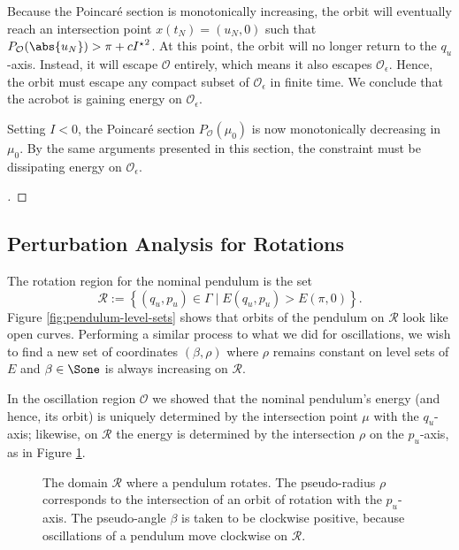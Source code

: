 Because the Poincar\'{e} section is monotonically increasing, 
the orbit will eventually reach an intersection point \(x(t_N) = (u_N,0)\)
such that \(P_\mathcal{O}(\abs{u_N}) > \pi + c{I^\star}^2\). 
At this point, the orbit will no longer return to the
\(q_u\)-axis.
Instead, it will escape \(\mathcal{O}\) entirely, which means
it also escapes \(\mathcal{O}_\epsilon\).
Hence, the orbit must escape any compact subset of 
\(\mathcal{O}_\epsilon\) in finite time. 
We conclude that the acrobot is gaining energy on \(\mathcal{O}_\epsilon\).

Setting \(I < 0\), the Poincar\'{e} section \(P_\mathcal{O}(\mu_0)\) is now
monotonically decreasing in \(\mu_0\).
By the same arguments presented in this section, the constraint 
must be dissipating energy on \(\mathcal{O}_\epsilon\).

\begin{proof}[\unskip\nopunct]
\end{proof}

\subsection*{Perturbation Analysis for Rotations}
The rotation region for the nominal pendulum is the set
\[
    \mathcal{R} := \left\{ (q_u,p_u) \in \Gamma \mid E(q_u,p_u) > E(\pi,0)\right\}
    .
\]
Figure \ref{fig:pendulum-level-sets} shows that orbits of the 
pendulum on \(\mathcal{R}\) look like open curves.
Performing a similar process to what we did for oscillations,
we wish to find a new set of coordinates \((\beta,\rho)\)
where \(\rho\) remains constant on level sets of \(E\)
and \(\beta \in \Sone\) is always increasing on \(\mathcal{R}\).

In the oscillation region \(\mathcal{O}\) we showed that the nominal pendulum's
energy (and hence, its orbit) is uniquely determined by the intersection point
\(\mu\) with the \(q_u\)-axis;
likewise, on \(\mathcal{R}\) the energy is determined by the
intersection \(\rho\) on the \(p_u\)-axis, as in Figure
\ref{fig:rho-intersection}.

\begin{figure}
    \centering
    \caption{The domain \(\mathcal{R}\) where a pendulum rotates. The
        pseudo-radius \(\rho\) corresponds to the intersection of an orbit of
        rotation with the \(p_u\)-axis. The pseudo-angle \(\beta\) is taken to
        be clockwise positive, because oscillations of a pendulum move clockwise
        on \(\mathcal{R}\).}
    \label{fig:rho-intersection}
\end{figure}

